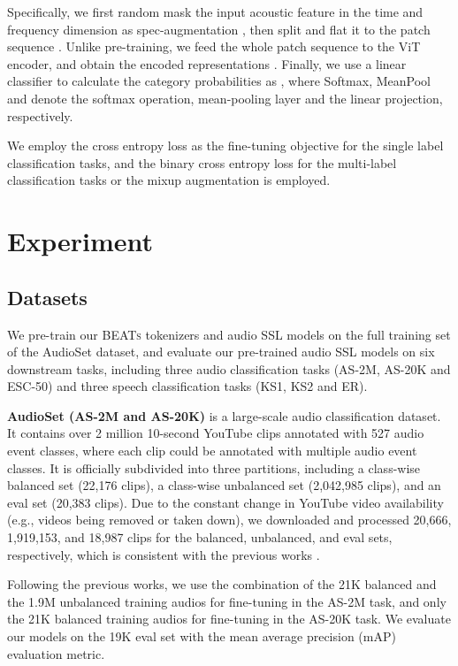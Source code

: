 \documentclass{article}
\theoremstyle{plain}
\theoremstyle{definition}
\theoremstyle{remark}
\newcommand\our{\textsc{BEATs}}
\begin{document}
Specifically, we first random mask the input acoustic feature in the time and frequency dimension as spec-augmentation \citep{park2019specaugment}, then split and flat it to the patch sequence .
Unlike pre-training, we feed the whole patch sequence  to the ViT encoder, and obtain the encoded representations .
Finally, we use a linear classifier to calculate the category probabilities as , where Softmax, MeanPool and  denote the softmax operation, mean-pooling layer and the linear projection, respectively. 

We employ the cross entropy loss as the fine-tuning objective for the single label classification tasks, and the binary cross entropy loss for the multi-label classification tasks or the mixup augmentation \citep{zhang2017mixup} is employed.

\section{Experiment}

\subsection{Datasets}

We pre-train our \our{}  tokenizers and audio SSL models on the full training set of the AudioSet dataset, and evaluate our pre-trained audio SSL models on six downstream tasks, including three audio classification tasks (AS-2M, AS-20K and ESC-50) and three speech classification tasks (KS1, KS2 and ER). 

\textbf{AudioSet (AS-2M and AS-20K)} \citep{gemmeke2017audio} is a large-scale audio classification dataset. It contains over 2 million 10-second YouTube clips annotated with 527 audio event classes, where each clip could be annotated with multiple audio event classes. It is officially subdivided into three partitions, including a class-wise balanced set (22,176 clips), a class-wise unbalanced set (2,042,985 clips), and an eval set (20,383 clips). Due to the constant change in YouTube video availability (e.g., videos being removed or taken down), we downloaded and processed 20,666, 1,919,153, and 18,987 clips for the balanced, unbalanced, and eval sets, respectively, which is consistent with the previous works \citep{baade2022mae}.

Following the previous works, we use the combination of the 21K balanced and the 1.9M unbalanced training audios for fine-tuning in the AS-2M task, and only the 21K balanced training audios for  fine-tuning in the AS-20K task. We evaluate our models on the 19K eval set with the  mean average precision (mAP) evaluation metric.
\end{document}
